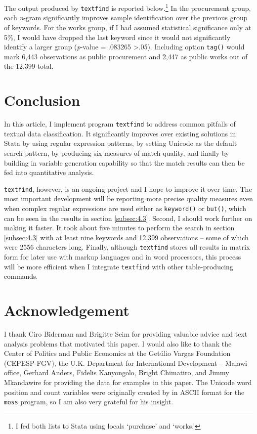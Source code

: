 The output produced by {\tt textfind} is reported below.\footnote{I fed both lists to Stata using locals `purchase' and `works.'} In the procurement group, each {\it n}-gram significantly improves sample identification over the previous group of keywords. For the works group, if I had assumed statistical significance only at 5\%, I would have dropped the last keyword since it would not significantly identify a larger group ({\it p}-value = .083265 \textgreater \space .05). Including option {\tt tag()} would mark 6,443 observations as public procurement and 2,447 as public works out of the 12,399 total.

\begin{stlog}
\nullskip
\end{stlog}

\section[Conclusion]{Conclusion}
In this article, I implement program {\tt textfind} to address common pitfalls of textual data classification. It significantly improves over existing solutions in Stata by using regular expression patterns, by setting Unicode as the default search pattern, by producing six measures of match quality, and finally by building in variable generation capability so that the match results can then be fed into quantitative analysis.

{\tt textfind}, however, is an ongoing project and I hope to improve it over time. The most important development will be reporting more precise quality measures even when complex regular expressions are used either as {\tt keyword()} or {\tt but()}, which can be seen in the results in section \ref{subsec:4.3}. Second, I should work further on making it faster. It took about five minutes to perform the search in section \ref{subsec:4.3} with at least nine keywords and 12,399 observations -- some of which were 2556 characters long. Finally, although {\tt textfind} stores all results in matrix form for later use with markup languages and in word processors, this process will be more efficient when I integrate {\tt textfind} with other table-producing commands.




\newpage
\section*{Acknowledgement}
I thank Ciro Biderman and Brigitte Seim for providing valuable advice and text analysis problems that motivated this paper. I would also like to thank the Center of Politics and Public Economics at the Get\'ulio Vargas Foundation (CEPESP-FGV), the U.K. Department for International Development -- Malawi office, Gerhard Anders, Fidelis Kanyongolo, Bright Chimatiro, and Jimmy Mkandawire for providing the data for examples in this paper. The Unicode word position and count variables were originally created by \cite{CoxStatatip982011} in ASCII format for the {\tt moss} program, so I am also very grateful for his insight.

\endinput
